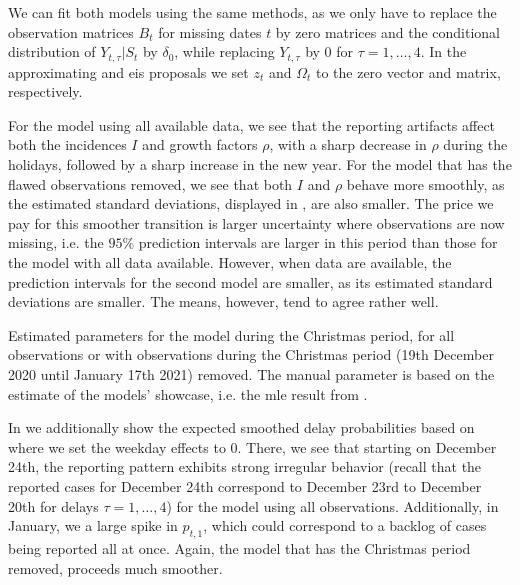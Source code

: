 We can fit both models using the same methods, as we only have to replace the observation matrices $B_{t}$ for missing dates $t$ by zero matrices and the conditional distribution of $Y_{t, \tau} | S_{t}$ by $\delta_{0}$, while replacing $Y_{t,\tau}$ by $0$ for $\tau = 1, \dots, 4$. In the approximating  and \acrshort{eis} proposals we set $z_{t}$ and $\Omega_{t}$ to the zero vector and matrix, respectively. 

For the model using all available data, we see that the reporting artifacts affect both the incidences $I$ and growth factors $\rho$, with a sharp decrease in $\rho$ during the holidays, followed by a sharp increase in the new year. For the model that has the flawed observations removed, we see that both $I$ and $\rho$ behave more smoothly, as the estimated standard deviations, displayed in , are also smaller. The price we pay for this smoother transition is larger uncertainty where observations are now missing, i.e. the $95\%$ prediction intervals are larger in this period than those for the model with all data available. However, when data are available, the prediction intervals for the second model are smaller, as its estimated standard deviations are smaller. The means, however, tend to agree rather well. 

\begin{table}
    \centering
    
    \caption{Estimated parameters for the model during the Christmas period, for all observations or with observations during the Christmas period (19th December 2020 until January 17th 2021) removed. The manual parameter is based on the estimate of the models' showcase, i.e. the \acrshort{mle} result from .}
    \label{tab:christmas-parameters}
\end{table}

In  we additionally show the expected smoothed delay probabilities based on  where we set the weekday effects to $0$. There, we see that starting on December 24th, the reporting pattern exhibits strong irregular behavior (recall that the reported cases for December 24th correspond to December 23rd to December 20th for delays $\tau =1, \dots, 4$) for the model using all observations. Additionally, in January, we a large spike in $p_{t,1}$, which could correspond to a backlog of cases being reported all at once. Again, the model that has the Christmas period removed, proceeds much smoother.

